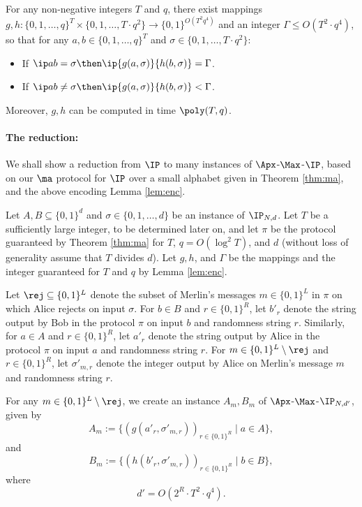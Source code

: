 \documentclass[11pt]{article}
\begin{document}
\begin{lem}\label{lem:enc}
For any non-negative integers $T$ and $q$, there exist  mappings $g,h: \{0,1, \ldots, q\}^{T} \times \{0,1, \ldots, T \cdot q^2\} \rightarrow\{0,1\}^{O(T^{2}q^{4})}$ and an integer $\Gamma \leq O(T^2 \cdot q^4)$, so that for any $a,b\in \{0,1,\ldots,q\}^{T}$ and $\sigma \in \{0,1, \ldots, T \cdot q^2\}$:
\begin{itemize}
\item If $\ip  a b =\sigma \then\ip{g(a,\sigma)}{h(b,\sigma)}=\Gamma$.
\item If $\ip  a b\neq \sigma \then\ip{g(a,\sigma)}{h(b,\sigma)}<\Gamma$.
\end{itemize}
Moreover, $g,h$ can be computed in time $\poly(T,q)$. 
\end{lem}

\paragraph{The reduction:}

We shall show a reduction from  $\IP$ to many instances of $\Apx$-$\Max$-$\IP$, based on our $\ma$ protocol for $\IP$ over a small alphabet given in Theorem \ref{thm:ma}, and the above encoding Lemma \ref{lem:enc}.

Let $A,B \subseteq \{0,1\}^{d}$ and $\sigma \in \{0,1,\ldots, d\}$ be an instance of $\IP_{N,d}$. Let $T$ be a sufficiently large integer, to be determined later on, and let $\pi$ be the protocol guaranteed by Theorem \ref{thm:ma} for $T$, $q=O(\log^2T)$, and $d$ (without loss of generality assume that $T$ divides $d$).
Let $g,h$, and $\Gamma$ be the mappings and the integer guaranteed for $T$ and $q$ by Lemma \ref{lem:enc}.

Let $\rej \subseteq \{0,1\}^L$ denote the subset of Merlin's messages $m \in \{0,1\}^L$ in $\pi$ on which Alice rejects on input $\sigma$. 
For $b \in B$ and $r \in \{0,1\}^R$, let $b'_r$ denote the string output by Bob in the protocol $\pi$ on input $b$ and randomness string $r$.
Similarly, for $a \in A$ and  $r \in \{0,1\}^R$, let $a'_r$ denote the string output by Alice in the protocol $\pi$ on input $a$ and randomness string $r$. For $m \in \{0,1\}^L \setminus \rej$ and $r \in \{0,1\}^R$, let $\sigma'_{m,r}$ denote the integer output by Alice on Merlin's message $m$ and randomness string $r$.

For any $m \in \{0,1\}^L \setminus \rej$,  we create an instance $A_m,B_m$ of $\Apx$-$\Max$-$\IP_{N,d'}$, given by
$$A_m:= \{ ( g(a'_r, \sigma'_{m,r}))_{r \in \{0,1\}^R} \mid a \in A\},$$
and 
$$B_m:= \{ ( h(b'_r, \sigma'_{m,r}))_{r \in \{0,1\}^R} \mid b \in B\},$$
where 
$$ d' =O(2^R \cdot T^2 \cdot q^4).$$
\end{document}
